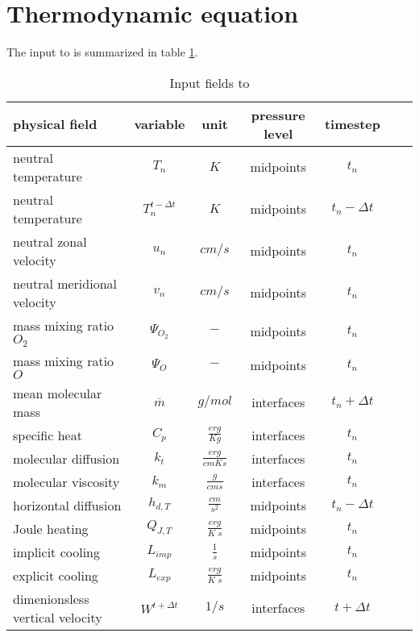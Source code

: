 %
\section{Thermodynamic equation }\label{cap:dt}
%
The input to  is summarized in table
\ref{tab:input_dt}.
%
\begin{table}[tb]
\begin{tabular}{|p{3.5cm} ||c|c|c|c|c|c|} \hline
physical field               & variable        & unit&pressure
level& timestep
\\ \hline \hline
%
neutral temperature &       $T_n$              & $K$   &  midpoints & $t_n$\\
neutral temperature &       $T_n^{t-\Delta t}$ & $K$   &  midpoints & $t_n-\Delta t$\\
neutral zonal velocity&     $u_n$     & $cm/s$   &  midpoints & $t_n$\\
neutral meridional velocity & $v_n$   & $cm/s$   &  midpoints & $t_n$\\
mass mixing ratio $O_2$&       {$\Psi_{O_2}$}     & $-$   & midpoints  & $t_n$\\
mass mixing ratio $O$&       {$\Psi_{O}$}     & $-$   &  midpoints & $t_n$\\
mean molecular mass&       {$\overline{m}$}     & $g/mol$   & interfaces  &$t_n + \Delta t$ \\
specific heat&       {$C_p$}     & $\frac{erg}{K g}$   & interfaces   &  $t_n$\\
molecular diffusion&       $k_t$     & $\frac{erg}{cm K s}$   & interfaces  & $t_n$ \\
molecular viscosity&       $k_m$     & $\frac{g}{cm s}$   & interfaces  & $t_n$ \\
horizontal diffusion&       {$h_{d,T}$}     & $\frac{cm}{s^2}$   & midpoints  & $t_n-\Delta t$\\
Joule heating &       {$Q_{J,T}$}     & $\frac{erg}{K\; s}$   & midpoints  &  $t_n$\\
implicit cooling &       {$L_{imp}$}     & $\frac{1}{s}$   & midpoints  & $t_n$\\
explicit cooling &       {$L_{exp}$}     & $\frac{erg}{K \; s}$   & midpoints  & $t_n$\\
dimenionsless vertical velocity& $W^{t+\Delta t}$& $1/s$   &
interfaces& $t+\Delta t$
 \\ \hline
\end{tabular}
\caption{Input fields to } \label{tab:input_dt}
\end{table}
